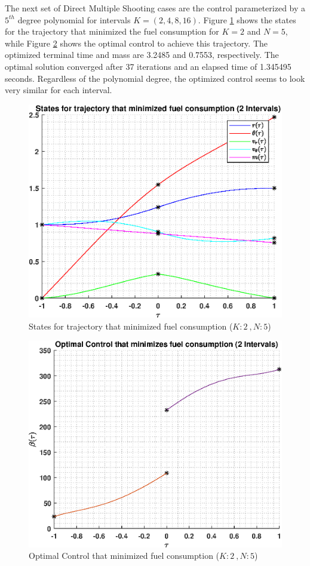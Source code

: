 \documentclass[]{article}
\begin{document}
\FloatBarrier
\noindent
The next set of Direct Multiple Shooting cases are the control parameterized by a \(5^{th}\) degree polynomial for intervals \(K = (2,4,8,16)\). Figure \ref{fig:directStatesK2Poly5} shows the states for the trajectory that minimized the fuel consumption for \(K = 2\) and  \(N = 5\), while Figure \ref{fig:directControlK2Poly5} shows the optimal control to achieve this trajectory. The optimized terminal time and mass are 3.2485 and 0.7553, respectively. The optimal solution converged after 37 iterations and an elapsed time of 1.345495 seconds. Regardless of the polynomial degree, the optimized control seems to look very similar for each interval.
\begin{figure}
	\centering
	\includegraphics[scale=0.75]{directStatesK2Poly5.eps}
	\caption{States for trajectory that minimized fuel consumption (\(K:2\ , N:5\))}
	\label{fig:directStatesK2Poly5}
\end{figure}
\begin{figure}
	\centering
	\includegraphics[scale=0.75]{directControlK2Poly5.eps}
	\caption{Optimal Control that minimized fuel consumption (\(K:2\ , N:5\))}
	\label{fig:directControlK2Poly5}
\end{figure}
\end{document}
